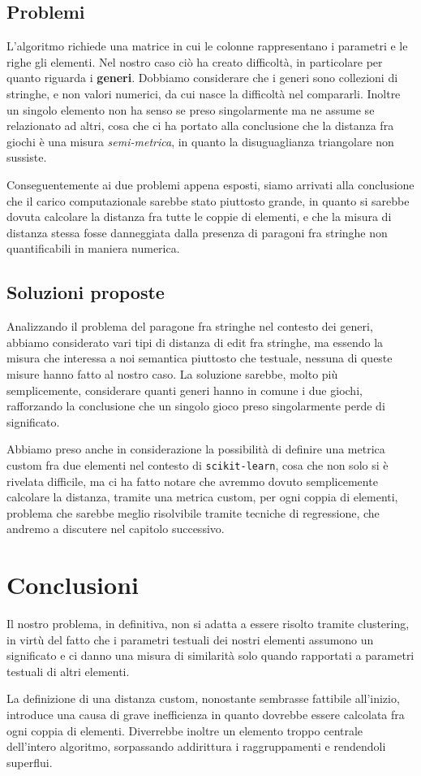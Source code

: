     \subsection{Problemi}
        L'algoritmo richiede una matrice in cui le colonne rappresentano i parametri e le righe gli elementi. Nel nostro caso ciò ha creato difficoltà, in particolare per quanto riguarda i \textbf{generi}. Dobbiamo considerare che i generi sono collezioni di stringhe, e non valori numerici, da cui nasce la difficoltà nel compararli. Inoltre un singolo elemento non ha senso se preso singolarmente ma ne assume se relazionato ad altri, cosa che ci ha portato alla conclusione che la distanza fra giochi è una misura \textit{semi-metrica}, in quanto la disuguaglianza triangolare non sussiste. 
        
        Conseguentemente ai due problemi appena esposti, siamo arrivati alla conclusione che il carico computazionale sarebbe stato piuttosto grande, in quanto si sarebbe dovuta calcolare la distanza fra tutte le coppie di elementi, e che la misura di distanza stessa fosse danneggiata dalla presenza di paragoni fra stringhe non quantificabili in maniera numerica.
        
    \subsection{Soluzioni proposte}
        Analizzando il problema del paragone fra stringhe nel contesto dei generi, abbiamo considerato vari tipi di distanza di edit fra stringhe, ma essendo la misura che interessa a noi semantica piuttosto che testuale, nessuna di queste misure hanno fatto al nostro caso. La soluzione sarebbe, molto più semplicemente, considerare quanti generi hanno in comune i due giochi, rafforzando la conclusione che un singolo gioco preso singolarmente perde di significato.
        
        Abbiamo preso anche in considerazione la possibilità di definire una metrica custom fra due elementi nel contesto di \texttt{scikit-learn}, cosa che non solo si è rivelata difficile, ma ci ha fatto notare che avremmo dovuto semplicemente calcolare la distanza, tramite una metrica custom, per ogni coppia di elementi, problema che sarebbe meglio risolvibile tramite tecniche di regressione, che andremo a discutere nel capitolo successivo.
    
\section{Conclusioni}
    Il nostro problema, in definitiva, non si adatta a essere risolto tramite clustering, in virtù del fatto che i parametri testuali dei nostri elementi assumono un significato e ci danno una misura di similarità solo quando rapportati a parametri testuali di altri elementi.
    
    La definizione di una distanza custom, nonostante sembrasse fattibile all'inizio, introduce una causa di grave inefficienza in quanto dovrebbe essere calcolata fra ogni coppia di elementi. Diverrebbe inoltre un elemento troppo centrale dell'intero algoritmo, sorpassando addirittura i raggruppamenti e rendendoli superflui.
